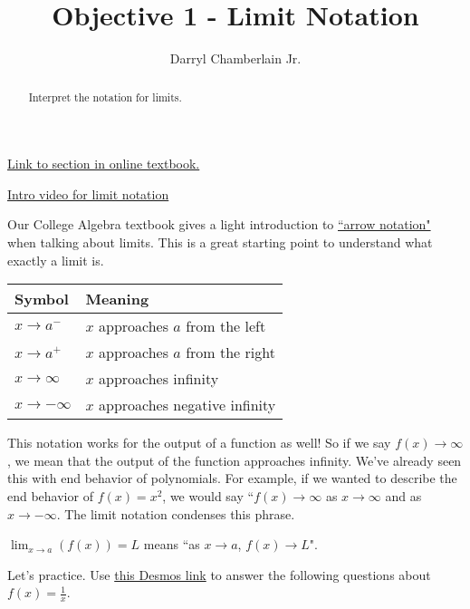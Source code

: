 \documentclass{ximera}
\author{Darryl Chamberlain Jr.}
\title{Objective 1 - Limit Notation}
\begin{document}
\begin{abstract}
Interpret the notation for limits.
\end{abstract}
\maketitle
 
\href{https://cnx.org/contents/i4nRcikn@5.1:dKCfyV9u@5/The-Limit-of-a-Function}{Link to section in online textbook.}

\href{https://www.youtube.com/watch?v=tXAu5Ib-Oxk}{Intro video for limit notation}
 


Our College Algebra textbook gives a light introduction to \href{https://cnx.org/contents/mwjClAV_@8.21:KNTP2r7D@14/Rational-Functions#Table_03_07_001}{``arrow notation"} when talking about limits. This is a great starting point to understand what exactly a limit is. 

\begin{tabular}{l | l}
\textbf{Symbol} & \textbf{Meaning} \\
\hline 
$x \rightarrow a^{-}$ & $x$ approaches $a$ from the left \\
$x \rightarrow a^{+}$ & $x$ approaches $a$ from the right \\ 
$x \rightarrow \infty$ & $x$ approaches infinity \\ 
$x \rightarrow -\infty$ & $x$ approaches negative infinity \\ 
\end{tabular}

This notation works for the output of a function as well! So if we say $f(x) \rightarrow \infty$, we mean that the output of the function approaches infinity. We've already seen this with end behavior of polynomials. For example, if we wanted to describe the end behavior of $f(x) = x^2$, we would say ``$f(x) \rightarrow \infty$ as $x \rightarrow \infty$ and as $x \rightarrow -\infty$. The limit notation condenses this phrase. 

\begin{definition}
$\lim_{x \rightarrow a} (f(x)) = L$ means ``as $x \rightarrow a$, $f(x) \rightarrow L$". 
\end{definition}

Let's practice. Use \href{https://www.desmos.com/calculator/x3mllngnj7}{this Desmos link} to answer the following questions about $f(x)=\frac{1}{x}$. 
\end{document}
